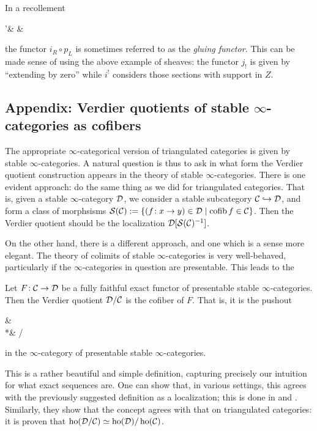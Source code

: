 In a recollement
\begin{diagram*}[column sep=large]
	\calT'\ar[r,"i" description,""{below,name=A},""{above,name=AA}] &
		\calT \ar[r,"p" description,""{below,name=C},""{above,name=CC}]\ar[l,bend left,shift left,"i_R",""{above,name=B}]\ar[l,bend right,shift right,"i_L"',""{below,name=BB}] &
		 \ar[l,bend left,shift left,"p_R",""{above,name=D}]\ar[l,bend right,shift right,"p_L"',""{below,name=DD}]
		\ar[from=B,to=A,symbol=\vdash]\ar[from=D,to=C,symbol=\vdash]
		\ar[from=AA,to=BB,symbol=\vdash]\ar[from=CC,to=DD,symbol=\vdash]
\end{diagram*}
the functor \(i_R\circ p_L\) is sometimes referred to as the \emph{gluing functor.} This can be made sense of using the above example of sheaves: the functor \(j_!\) is given
by ``extending by zero'' while \(i^!\) considers those sections with support in \(Z\).

\subsection{Appendix: Verdier quotients of stable \(\infty\)-categories as cofibers}
The appropriate \(\infty\)-categorical version of triangulated categories is given by stable \(\infty\)-categories. A natural question is thus to ask in
what form the Verdier quotient construction appears in the theory of stable \(\infty\)-categories. There is one evident approach: do the same thing as we did
for triangulated categories. That is, given a stable \(\infty\)-category \(\mathcal{D}\), we consider a stable subcategory \(\mathcal{C}\hookrightarrow\mathcal{D}\), and form
a class of morphsisms \(\mathcal{S}(\mathcal{C}) := \{ (f\!:x\to y)\in\mathcal{D}\mid \operatorname{cofib}{f}\in\mathcal{C} \}\). Then the Verdier quotient should be the localization \(\mathcal{D}[\mathcal{S}(\mathcal{C})^{-1}]\).

On the other hand, there is a different approach, and one which is a sense more elegant. The theory of colimits of stable \(\infty\)-categories is very well-behaved,
particularly if the \(\infty\)-categories in question are presentable. This leads to the
\begin{definition}
	Let \(F\!:\mathcal{C}\to\mathcal{D}\) be a fully faithful exact functor of presentable stable \(\infty\)-categories. Then the Verdier quotient \(\mathcal{D}/\mathcal{C}\)
	is the cofiber of \(F\). That is, it is the pushout
	\begin{diagram*}
		\calC\ar[r,"F"]\ar[d] & \calD\ar[d] \\
		*\ar[r] & \calD/\calC\ar[ul,pushout]
	\end{diagram*}
	in the \(\infty\)-category of presentable stable \(\infty\)-categories.
\end{definition}
This is a rather beautiful and simple definition, capturing precisely our intuition for what exact sequences are. One can show that, in various settings,
this agrees with the previously suggested definition as a localization; this is done in \cite{Blumberg_Gepner_Tabuada_2013} and \cite{drew2015verdierquotientsstablequasicategories}.
Similarly, they show that the concept agrees with that on triangulated categories: it is proven that \(\operatorname{ho}(\mathcal{D}/\mathcal{C})\simeq\operatorname{ho}(\mathcal{D})/\operatorname{ho}(\mathcal{C})\).
